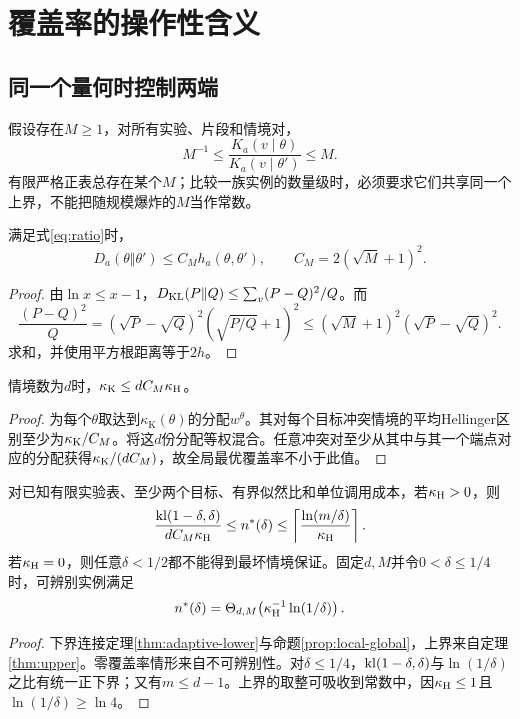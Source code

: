 \chapter{覆盖率的操作性含义}
\label{ch:operational}

\section{同一个量何时控制两端}
假设存在$M\ge1$，对所有实验、片段和情境对，
\begin{equation}
 M^{-1}\le\frac{K_a(v\mid\theta)}{K_a(v\mid\theta')}\le M.
 \label{eq:ratio}
\end{equation}
有限严格正表总存在某个$M$；比较一族实例的数量级时，必须要求它们共享同一个上界，不能把随规模爆炸的$M$当作常数。

\begin{lemma}[KL与Hellinger区别的比较]
\label{lem:comparison}
满足式\eqref{eq:ratio}时，
\[
 D_a(\theta\Vert\theta')\le C_Mh_a(\theta,\theta'),
 \qquad C_M=2(\sqrt M+1)^2.
\]
\end{lemma}
\begin{proof}
由$\ln x\le x-1$，$D_{\mathrm{KL}}(P\Vert Q)\le\sum_v(P-Q)^2/Q$。而
\[
 \frac{(P-Q)^2}{Q}=(\sqrt P-\sqrt Q)^2(\sqrt{P/Q}+1)^2
 \le(\sqrt M+1)^2(\sqrt P-\sqrt Q)^2.
\]
求和，并使用平方根距离等于$2h$。
\end{proof}

\begin{proposition}[局部分配到全局分配]
\label{prop:local-global}
情境数为$d$时，$\kappa_{\mathrm K}\le dC_M\kappa_{\mathrm H}$。
\end{proposition}
\begin{proof}
为每个$\theta$取达到$\kappa_{\mathrm K}(\theta)$的分配$w^\theta$。其对每个目标冲突情境的平均Hellinger区别至少为$\kappa_{\mathrm K}/C_M$。将这$d$份分配等权混合。任意冲突对至少从其中与其一个端点对应的分配获得$\kappa_{\mathrm K}/(dC_M)$，故全局最优覆盖率不小于此值。
\end{proof}

\begin{theorem}[有限诊断组织的操作性界]
\label{thm:main}
对已知有限实验表、至少两个目标、有界似然比和单位调用成本，若$\kappa_{\mathrm H}>0$，则
\begin{equation}
 \frac{\operatorname{kl}(1-\delta,\delta)}{dC_M\kappa_{\mathrm H}}
 \le n^*(\delta)
 \le\left\lceil\frac{\ln(m/\delta)}{\kappa_{\mathrm H}}\right\rceil.
 \label{eq:main}
\end{equation}
若$\kappa_{\mathrm H}=0$，则任意$\delta<1/2$都不能得到最坏情境保证。固定$d,M$并令$0<\delta\le1/4$时，可辨别实例满足
\[
 n^*(\delta)=\Theta_{d,M}\!\left(\kappa_{\mathrm H}^{-1}\ln(1/\delta)\right).
\]
\end{theorem}
\begin{proof}
下界连接定理\ref{thm:adaptive-lower}与命题\ref{prop:local-global}，上界来自定理\ref{thm:upper}。零覆盖率情形来自不可辨别性。对$\delta\le1/4$，$\operatorname{kl}(1-\delta,\delta)$与$\ln(1/\delta)$之比有统一正下界；又有$m\le d-1$。上界的取整可吸收到常数中，因$\kappa_{\mathrm H}\le1$且$\ln(1/\delta)\ge\ln4$。
\end{proof}

